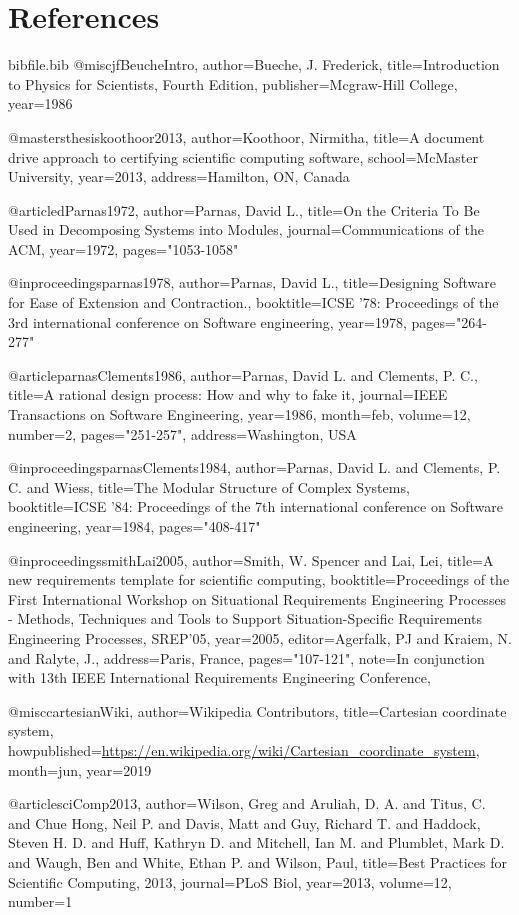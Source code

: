 \documentclass[12pt]{article}
\begin{document}
\section{References}
\label{Sec:References}
\begin{filecontents*}{bibfile.bib}
@misc{jfBeucheIntro,
author={Bueche, J. Frederick},
title={Introduction to Physics for Scientists, Fourth Edition},
publisher={Mcgraw-Hill College},
year={1986}}

@mastersthesis{koothoor2013,
author={Koothoor, Nirmitha},
title={A document drive approach to certifying scientific computing software},
school={McMaster University},
year={2013},
address={Hamilton, ON, Canada}}

@article{dParnas1972,
author={Parnas, David L.},
title={On the Criteria To Be Used in Decomposing Systems into Modules},
journal={Communications of the ACM},
year={1972},
pages={"1053-1058"}}

@inproceedings{parnas1978,
author={Parnas, David L.},
title={Designing Software for Ease of Extension and Contraction.},
booktitle={ICSE '78: Proceedings of the 3rd international conference on Software engineering},
year={1978},
pages={"264-277"}}

@article{parnasClements1986,
author={Parnas, David L. and Clements, P. C.},
title={A rational design process: How and why to fake it},
journal={IEEE Transactions on Software Engineering},
year={1986},
month=feb,
volume={12},
number={2},
pages={"251-257"},
address={Washington, USA}}

@inproceedings{parnasClements1984,
author={Parnas, David L. and Clements, P. C. and Wiess},
title={The Modular Structure of Complex Systems},
booktitle={ICSE '84: Proceedings of the 7th international conference on Software engineering},
year={1984},
pages={"408-417"}}

@inproceedings{smithLai2005,
author={Smith, W. Spencer and Lai, Lei},
title={A new requirements template for scientific computing},
booktitle={Proceedings of the First International Workshop on Situational Requirements Engineering Processes - Methods, Techniques and Tools to Support Situation-Specific Requirements Engineering Processes, SREP'05},
year={2005},
editor={Agerfalk, PJ and Kraiem, N. and Ralyte, J.},
address={Paris, France},
pages={"107-121"},
note={In conjunction with 13th IEEE International Requirements Engineering Conference,}}

@misc{cartesianWiki,
author={Wikipedia Contributors},
title={Cartesian coordinate system},
howpublished={\url{https://en.wikipedia.org/wiki/Cartesian\_coordinate\_system}},
month=jun,
year={2019}}

@article{sciComp2013,
author={Wilson, Greg and Aruliah, D. A. and Titus, C. and Chue Hong, Neil P. and Davis, Matt and Guy, Richard T. and Haddock, Steven H. D. and Huff, Kathryn D. and Mitchell, Ian M. and Plumblet, Mark D. and Waugh, Ben and White, Ethan P. and Wilson, Paul},
title={Best Practices for Scientific Computing, 2013},
journal={PLoS Biol},
year={2013},
volume={12},
number={1}}
\end{filecontents*}
\nocite{*}
\printbibliography[heading=none]
\end{document}
